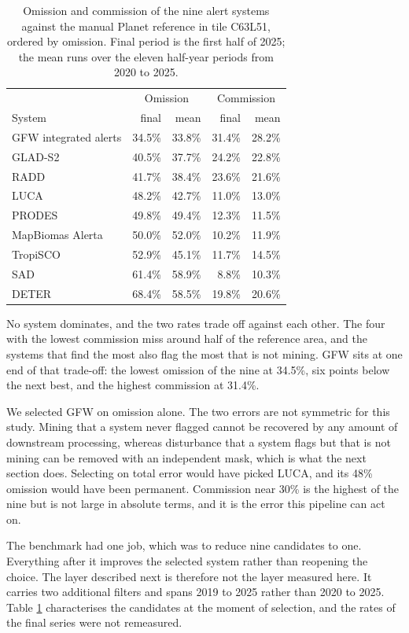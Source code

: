 \documentclass[11pt]{article}
\begin{document}
\begin{table}[htbp]
\centering
\begin{tabular}{lrrrr}
\hline
 & \multicolumn{2}{c}{Omission} & \multicolumn{2}{c}{Commission} \\
System & final & mean & final & mean \\
\hline
GFW integrated alerts & 34.5\% & 33.8\% & 31.4\% & 28.2\% \\
GLAD-S2 & 40.5\% & 37.7\% & 24.2\% & 22.8\% \\
RADD & 41.7\% & 38.4\% & 23.6\% & 21.6\% \\
LUCA & 48.2\% & 42.7\% & 11.0\% & 13.0\% \\
PRODES & 49.8\% & 49.4\% & 12.3\% & 11.5\% \\
MapBiomas Alerta & 50.0\% & 52.0\% & 10.2\% & 11.9\% \\
TropiSCO & 52.9\% & 45.1\% & 11.7\% & 14.5\% \\
SAD & 61.4\% & 58.9\% & 8.8\% & 10.3\% \\
DETER & 68.4\% & 58.5\% & 19.8\% & 20.6\% \\
\hline
\end{tabular}
\caption{Omission and commission of the nine alert systems against the manual Planet reference in tile C63L51, ordered by omission. Final period is the first half of 2025; the mean runs over the eleven half-year periods from 2020 to 2025.}
\label{tab:rates}
\end{table}

No system dominates, and the two rates trade off against each other. The four with the lowest commission miss around half of the reference area, and the systems that find the most also flag the most that is not mining. GFW sits at one end of that trade-off: the lowest omission of the nine at 34.5\%, six points below the next best, and the highest commission at 31.4\%.

We selected GFW on omission alone. The two errors are not symmetric for this study. Mining that a system never flagged cannot be recovered by any amount of downstream processing, whereas disturbance that a system flags but that is not mining can be removed with an independent mask, which is what the next section does. Selecting on total error would have picked LUCA, and its 48\% omission would have been permanent. Commission near 30\% is the highest of the nine but is not large in absolute terms, and it is the error this pipeline can act on.

The benchmark had one job, which was to reduce nine candidates to one. Everything after it improves the selected system rather than reopening the choice. The layer described next is therefore not the layer measured here. It carries two additional filters and spans 2019 to 2025 rather than 2020 to 2025. Table \ref{tab:rates} characterises the candidates at the moment of selection, and the rates of the final series were not remeasured.
\end{document}
